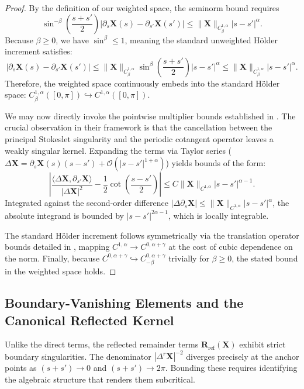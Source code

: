 \documentclass{amsart}
\begin{document}
\begin{proof}
By the definition of our weighted space, the seminorm bound requires $$\sin^{-\beta}\left(\frac{s+s'}{2}\right)|\partial_s \mathbf{X}(s) - \partial_{s'} \mathbf{X}(s')| \le \|\mathbf{X}\|_{C^{1,\alpha}_\beta} |s-s'|^\alpha.$$ Because $\beta \ge 0$, we have $\sin^\beta \le 1$, meaning the standard unweighted Hölder increment satisfies:
\[
|\partial_s \mathbf{X}(s) - \partial_{s'} \mathbf{X}(s')| \le \|\mathbf{X}\|_{C^{1,\alpha}_\beta} \sin^{\beta}\left(\frac{s+s'}{2}\right) |s-s'|^\alpha \le \|\mathbf{X}\|_{C^{1,\alpha}_\beta} |s-s'|^\alpha.
\]
Therefore, the weighted space continuously embeds into the standard Hölder space: $C^{1,\alpha}_\beta([0,\pi]) \hookrightarrow C^{1,\alpha}([0,\pi])$.

We may now directly invoke the pointwise multiplier bounds established in \cite[Section 4]{mori2019well}. The crucial observation in their framework is that the cancellation between the principal Stokeslet singularity and the periodic cotangent operator leaves a weakly singular kernel. Expanding the terms via Taylor series ($\Delta \mathbf{X} = \partial_s \mathbf{X}(s)(s-s') + \mathcal{O}(|s-s'|^{1+\alpha})$) yields bounds of the form:
\[
\left| \frac{\langle \Delta \mathbf{X}, \partial_{s'} \mathbf{X} \rangle}{|\Delta \mathbf{X}|^2} - \frac{1}{2}\cot\left(\frac{s-s'}{2}\right) \right| \le C \|\mathbf{X}\|_{C^{1,\alpha}} |s-s'|^{\alpha-1}.
\]
Integrated against the second-order difference $|\Delta \partial_s \mathbf{X}| \le \|\mathbf{X}\|_{C^{1,\alpha}} |s-s'|^\alpha$, the absolute integrand is bounded by $|s-s'|^{2\alpha-1}$, which is locally integrable. 

The standard Hölder increment follows symmetrically via the translation operator bounds detailed in \cite{mori2019well}, mapping $C^{1,\alpha} \to C^{0,\alpha+\gamma}$ at the cost of cubic dependence on the norm. Finally, because $C^{0,\alpha+\gamma} \hookrightarrow C^{0,\alpha+\gamma}_{-\beta}$ trivially for $\beta \ge 0$, the stated bound in the weighted space holds.
\end{proof}

\subsection{Boundary-Vanishing Elements and the Canonical Reflected Kernel}

Unlike the direct terms, the reflected remainder terms $\mathbf{R}_{\mathrm{ref}}(\mathbf{X})$ exhibit strict boundary singularities. The denominator $|\Delta^r \mathbf{X}|^{-2}$ diverges precisely at the anchor points as $(s+s') \to 0$ and $(s+s') \to 2\pi$. Bounding these requires identifying the algebraic structure that renders them subcritical.
\end{document}

